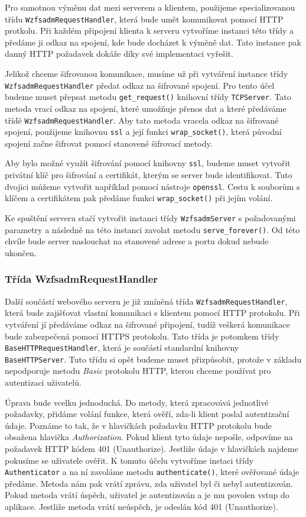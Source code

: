     Pro samotnou výměnu dat mezi serverem a klientem, použijeme specializovanou třídu \verb|WzfsadmRequestHandler|, která bude umět komunikovat pomocí HTTP protkolu. Při každém připojení klienta k serveru vytvoříme instanci této třídy a předáme ji odkaz na spojení, kde bude docházet k výměně dat. Tato instance pak danný HTTP požadavek dokáže díky své implementaci vyřešit.

    Jelikož chceme šifrovanou komunikace, musíme už při vytváření instance třídy \verb|WzfsadmRequestHandler| předat odkaz na šifrované spojení. Pro tento účel budeme muset přepsat metodu \verb|get_request()| knihovní třídy \verb|TCPServer|. Tato metoda vrací odkaz na spojení, které umožňuje přenos dat a které předáváme třídě \verb|WzfsadmRequestHandler|. Aby tato metoda vracela odkaz na šifrované spojení, použijeme knihovnu \verb|ssl| a její funkci \verb|wrap_socket()|, která původní spojení začne šifrovat pomocí stanovené šifrovací metody.

    Aby bylo možné využít šifrování pomocí knihovny \verb|ssl|, budeme muset vytvořit privátní klíč pro šifrování a certifikát, kterým se server bude identifikovat. Tuto dvojici můžeme vytvořit například pomocí nástroje \verb|openssl|. Cestu k souborům s klíčem a certifikátem pak předáme funkci \verb|wrap_socket()| při jejím volání.

    Ke spuštění serveru stačí vytvořit instanci třídy \verb|WzfsadmServer| s požadovanými parametry a následně na této instanci zavolat metodu \verb|serve_forever()|. Od této chvíle bude server naslouchat na stanovené adrese a portu dokud nebude ukončen.


    \subsubsection{Třída WzfsadmRequestHandler}
    Další součástí webového serveru je již zmíněná třída \verb|WzfsadmRequestHandler|, která bude zajišťovat vlastní komunikaci s klientem pomocí HTTP protokolu. Při vytváření jí předáváme odkaz na šifrované připojení, tudíž veškerá komunikace bude zabezpečená pomocí HTTPS protokolu. Tato třída je potomkem třídy \verb|BaseHTTPRequestHandler|, která je součástí standardní knihovny \verb|BaseHTTPServer|. Tuto třídu si opět budeme muset přizpůsobit, protože v základu nepodporuje metodu \emph{Basic} protokolu HTTP, kterou chceme používat pro autentizaci uživatelů.

    Úprava bude vcelku jednoduchá. Do metody, která zpracovává jednotlivé požadavky, přidáme volání funkce, která ověří, zda-li klient poslal autentizační údaje. Poznáme to tak, že v hlavičkách požadavku HTTP protokolu bude obsažena hlavička \emph{Authorization}. Pokud klient tyto údaje nepošle, odpovíme na požadavek HTTP kódem 401 (Unauthorize). Jestliže údaje v hlavičkách najdeme pokusíme se uživatele ověřit. K tomuto účelu vytvoříme instaci třídy \verb|Authenticator| a na ní zavoláme metodu \verb|authenticate()|, které ověřované údaje předáme. Metoda nám pak vrátí zprávu, zda uživatel  byl či nebyl autentizován. Pokud metoda vrátí úspěch, uživatel je autentizován a je mu povolen vstup do aplikace. Jestliže metoda vrátí neúspěch, je odeslán kód 401 (Unauthorize).

